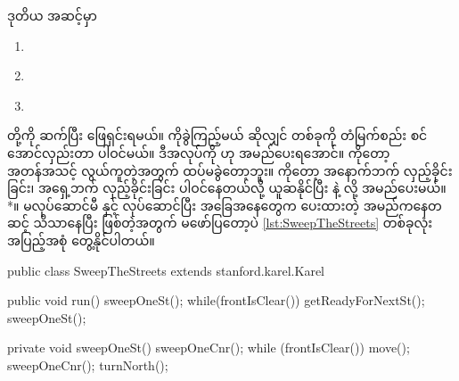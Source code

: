 \begin{sloppypar}
\begin{figure}[tbh!]
  \vspace*{0.1in}
  \begin{subfigure}[t]{0.48\textwidth}
    \caption{}
    \label{fig:getReadyForNextPreEven}
  \end{subfigure}
  \hspace{0.1in}
  \begin{subfigure}[t]{0.48\textwidth}
      \caption{}
      \label{fig:getReadyForNextPostEven}
  \end{subfigure}
  \label{fig:getReadyForNextPostAndPost}
\end{figure}

\noindent ဒုတိယ  အဆင့်မှာ 
\begin{enumerate}
  \item {} \label{itm:sweepOneSt}
  \item {} \label{itm:turnNorth}
  \item {} \label{itm:getReadyForNextSt}
\end{enumerate}
တို့ကို ဆက်ပြီး ဖြေရှင်းရမယ်။  ကိုခွဲကြည့်မယ် ဆိုလျှင် \mmcorner တစ်ခုကို တံမြက်စည်း စင်အောင်လှည်းတာ ပါဝင်မယ်။ ဒီအလုပ်ကို  ဟု အမည်ပေးရအောင်။  ကိုတော့ အတန်အသင့် လွယ်ကူတဲ့အတွက် ထပ်မခွဲတော့ဘူး။  ကိုတော့ အနောက်ဘက် လှည့်ခိုင်းခြင်း၊ အရှေ့ဘက် လှည့်ခိုင်းခြင်း ပါဝင်နေတယ်လို့ ယူဆနိုင်ပြီး  နဲ့  လို့ အမည်ပေးမယ်။ *။ မလုပ်ဆောင်မီ နှင့် လုပ်ဆောင်ပြီး အခြေအနေတွေက ပေးထားတဲ့ အမည်ကနေတဆင့် သိသာနေပြီး ဖြစ်တဲ့အတွက် မဖော်ပြတော့ပဲ \Lst \ref{lst:SweepTheStreets} \mmprogram တစ်ခုလုံး အပြည့်အစုံ တွေ့နိုင်ပါတယ်။ 

\begin{lstcodelong}[{\mycodelstcpt{SweepTheStreets}}, label={lst:SweepTheStreets}] 
public class SweepTheStreets extends stanford.karel.Karel {
        public void run() {
                sweepOneSt();
                while(frontIsClear()) {
                        getReadyForNextSt();
                        sweepOneSt();
                }
        }

        private void sweepOneSt() {
                sweepOneCnr();
                while (frontIsClear()) {
                        move();
                        sweepOneCnr();
                }
                turnNorth();
        }

}
\end{lstcodelong}
\end{sloppypar}
